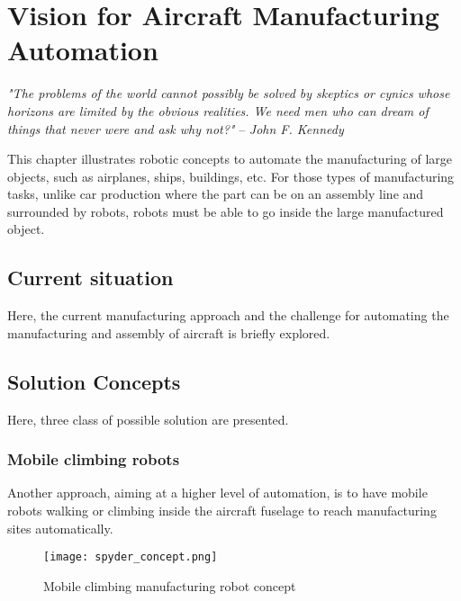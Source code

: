 \chapter{Vision for Aircraft Manufacturing Automation}
\label{sec:VisionForAircraftManufacturingAutomation}

{\small
\textit{"The problems of the world cannot possibly be solved by skeptics or cynics whose horizons are limited by the obvious realities. We need men who can dream of things that never were and ask why not?"}  -- \emph{John F. Kennedy}
}
\vspace{+10pt}

This chapter illustrates robotic concepts to automate the manufacturing of large objects, such as airplanes, ships, buildings, etc. For those types of manufacturing tasks, unlike car production where the part can be on an assembly line and surrounded by robots, robots must be able to go inside the large manufactured object. %


\section{Current situation}
\label{sec:CurrentSituation}

Here, the current manufacturing approach and the challenge for automating the manufacturing and assembly of aircraft is briefly explored.


\section{Solution Concepts}

Here, three class of possible solution are presented.




\subsection{Mobile climbing robots}
\label{sec:MobileClimbingRobots}

Another approach, aiming at a higher level of automation, is to have mobile robots walking or climbing inside the aircraft fuselage to reach manufacturing sites automatically. 


\begin{figure}[H]
	\centering
		\texttt{[image: spyder\_concept.png]}
		\caption{Mobile climbing manufacturing robot concept}
	\label{fig:arm_concept}
\end{figure}


